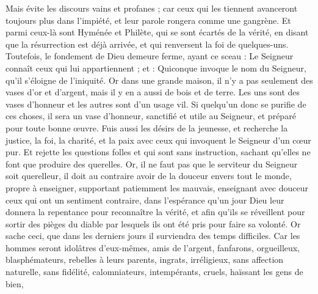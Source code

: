 \begin{multicols}{2}
Mais évite les discours vains et profanes ; car ceux qui les tiennent avanceront toujours plus dans l'impiété,
et leur parole rongera comme une gangrène. Et parmi ceux-là sont Hyménée et Philète,
qui se sont écartés de la vérité, en disant que la résurrection est déjà arrivée, et qui renversent la foi de quelques-uns.
Toutefois, le fondement de Dieu demeure ferme, ayant ce sceau : Le Seigneur connaît ceux qui lui appartiennent ; et : Quiconque invoque le nom du Seigneur, qu'il s’éloigne de l'iniquité.
Or dans une grande maison, il n'y a pas seulement des vases d'or et d'argent, mais il y en a aussi de bois et de terre. Les uns sont des vases d’honneur et les autres sont d’un usage vil.
Si quelqu'un donc se purifie de ces choses, il sera un vase d’honneur, sanctifié et utile au Seigneur, et préparé pour toute bonne œuvre.
Fuis aussi les désirs de la jeunesse, et recherche la justice, la foi, la charité, et la paix avec ceux qui invoquent le Seigneur d'un cœur pur.
Et rejette les questions folles et qui sont sans instruction, sachant qu'elles ne font que produire des querelles.
Or, il ne faut pas que le serviteur du Seigneur soit querelleur, il doit au contraire avoir de la douceur envers tout le monde, propre à enseigner, supportant patiemment les mauvais,
enseignant avec douceur ceux qui ont un sentiment contraire, dans l'espérance qu'un jour Dieu leur donnera la repentance pour reconnaître la vérité,
et afin qu'ils se réveillent pour sortir des pièges du diable par lesquels ils ont été pris pour faire sa volonté.
\VerseOne{}Or sache ceci, que dans les derniers jours il surviendra des temps difficiles.
Car les hommes seront idolâtres d’eux-mêmes, amis de l’argent, fanfarons, orgueilleux, blasphémateurs, rebelles à leurs parents, ingrats, irréligieux,
sans affection naturelle, sans fidélité, calomniateurs, intempérants, cruels, haïssant les gens de bien,

\end{multicols}
